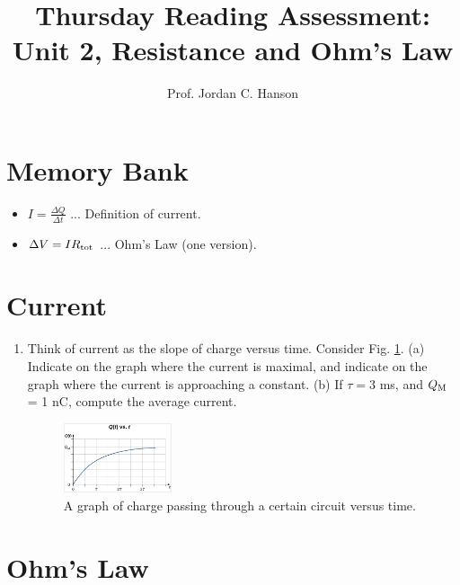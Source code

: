 \documentclass{article}
\begin{document}
\title{Thursday Reading Assessment: Unit 2, Resistance and Ohm's Law}
\author{Prof. Jordan C. Hanson}

\maketitle

\section{Memory Bank}

\begin{itemize}
\item $I = \frac{\Delta Q}{\Delta t}$ ... Definition of current.
\item $\Delta V = I R_{\rm tot}$ ... Ohm's Law (one version).
\end{itemize}

\section{Current}

\begin{enumerate}
\item Think of current as the slope of charge versus time.  Consider Fig. \ref{fig:current1}.  (a) Indicate on the graph where the current is maximal, and indicate on the graph where the current is approaching a constant.  (b) If $\tau = 3$ ms, and $Q_{\rm M}$ = 1 nC, compute the average current.
\begin{figure}[ht]
\centering
\includegraphics[width=0.3\textwidth]{current1.png}
\caption{\label{fig:current1} A graph of charge passing through a certain circuit versus time.}
\end{figure}
\end{enumerate}

\section{Ohm's Law}
\end{document}
